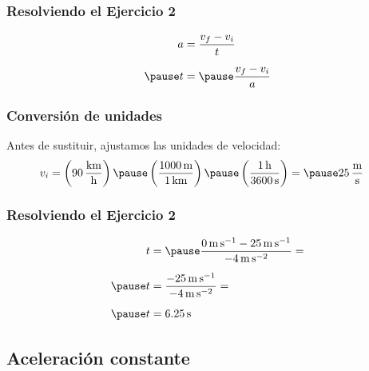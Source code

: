 \documentclass[14pt]{beamer}
\begin{document}
\begin{frame}
\frametitle{Resolviendo el Ejercicio 2}
\pause
\begin{eqnarray*}
\begin{aligned}
a &= \dfrac{v_{f} - v_{i}}{t} \\[0.5em] \pause
t &= \pause \dfrac{v_{f} - v_{i}}{a}
\end{aligned}
\end{eqnarray*}
\end{frame}
\begin{frame}
\frametitle{Conversión de unidades}
Antes de sustituir, ajustamos las unidades de velocidad:
\begin{eqnarray*}
\begin{aligned}
v_{i} &= \left( \SI[per-mode=fraction]{90}{\kilo\meter\per\hour} \right) \pause \left( \dfrac{\SI{1000}{\meter}}{\SI{1}{\kilo\meter}} \right) \pause \left( \dfrac{\SI{1}{\hour}}{\SI{3600}{\second}} \right) = \pause \SI[per-mode=fraction]{25}{\meter\per\second}
\end{aligned}
\end{eqnarray*}
\end{frame}
\begin{frame}
\frametitle{Resolviendo el Ejercicio 2}
\pause
\begin{eqnarray*}
\begin{aligned}
t &= \pause \dfrac{ \SI{0}{\meter\per\second} - \SI{25}{\meter\per\second}}{- \SI{4}{\meter\per\square\second}} = \\[0.5em] \pause
t &= \dfrac{- \SI{25}{\meter\per\second}}{- \SI{4}{\meter\per\square\second}} = \\[0.5em] \pause
t &= \SI{6.25}{\second}
\end{aligned}
\end{eqnarray*}
\end{frame}


\subsection{Aceleración constante}
\end{document}
